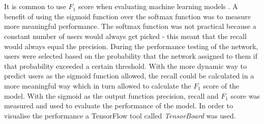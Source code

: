 \\\\
It is common to use $F_1$ score when evaluating machine learning models \parencite{yang1999re}. A benefit of using the sigmoid function over the softmax function was to measure more meaningful performance. The softmax function was not practical because a constant number of users would always get picked - this meant that the recall would always equal the precision. During the performance testing of the network, users were selected based on the probability that the network assigned to them if that probability exceeded a certain threshold. With the more dynamic way to predict users as the sigmoid function allowed, the recall could be calculated in a more meaningful way which in turn allowed to calculate the $F_1$ score of the model. With the sigmoid as the output function precision, recall and $F_1$ score was measured and used to evaluate the performance of the model. In order to visualise the performance a TensorFlow tool called \textit{TensorBoard} was used.
